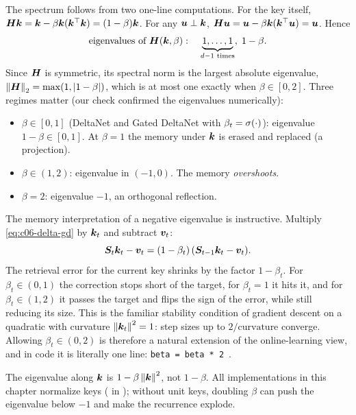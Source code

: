 The spectrum follows from two one-line computations. For the key itself,
$\bm{H}\bm{k}=\bm{k}-\beta\bm{k}(\bm{k}^{\top}\bm{k})=(1-\beta)\bm{k}$. For any $\bm{u}\perp\bm{k}$,
$\bm{H}\bm{u}=\bm{u}-\beta\bm{k}(\bm{k}^{\top}\bm{u})=\bm{u}$. Hence
\begin{equation}\label{eq:c06-hh-eig}
  \text{eigenvalues of }\bm{H}(\bm{k},\beta):\quad \underbrace{1,\dots,1}_{d-1\text{ times}},\;1-\beta .
\end{equation}
Since $\bm{H}$ is symmetric, its spectral norm is the largest absolute eigenvalue,
$\left\lVert \bm{H}\right\rVert_2=\max(1,\left\lvert 1-\beta\right\rvert)$, which is at most one exactly when
$\beta\in[0,2]$. Three regimes matter (our check confirmed the eigenvalues numerically):
\begin{itemize}
\item $\beta\in[0,1]$ (DeltaNet and Gated DeltaNet with $\beta_t=\sigma(\cdot)$):
eigenvalue $1-\beta\in[0,1]$. At $\beta=1$ the memory under $\bm{k}$ is erased and replaced
(a projection).
\item $\beta\in(1,2)$: eigenvalue in $(-1,0)$. The memory \emph{overshoots}.
\item $\beta=2$: eigenvalue $-1$, an orthogonal reflection.
\end{itemize}
The memory interpretation of a negative eigenvalue is instructive. Multiply
\eqref{eq:c06-delta-gd} by $\bm{k}_t$ and subtract $\bm{v}_t$:
\begin{equation}\label{eq:c06-residual}
  \bm{S}_t\bm{k}_t-\bm{v}_t=(1-\beta_t)\,(\bm{S}_{t-1}\bm{k}_t-\bm{v}_t).
\end{equation}
The retrieval error for the current key shrinks by the factor $1-\beta_t$. For
$\beta_t\in(0,1)$ the correction stops short of the target, for $\beta_t=1$ it hits it, and
for $\beta_t\in(1,2)$ it passes the target and flips the sign of the error, while still
reducing its size. This is the familiar stability condition of gradient descent on a
quadratic with curvature $\left\lVert \bm{k}_t\right\rVert^2=1$: step sizes up to $2/\text{curvature}$ converge.
Allowing $\beta_t\in(0,2)$ is therefore a natural extension of the online-learning view,
and in code it is literally one line: \texttt{beta = beta * 2}~\citep{c03-grazzi2025unlocking}.

\begin{pitfall}
The eigenvalue along $\bm{k}$ is $1-\beta\left\lVert \bm{k}\right\rVert^2$, not $1-\beta$. All implementations in
this chapter normalize keys ( in \fla); without unit
keys, doubling $\beta$ can push the eigenvalue below $-1$ and make the recurrence explode.
\end{pitfall}

